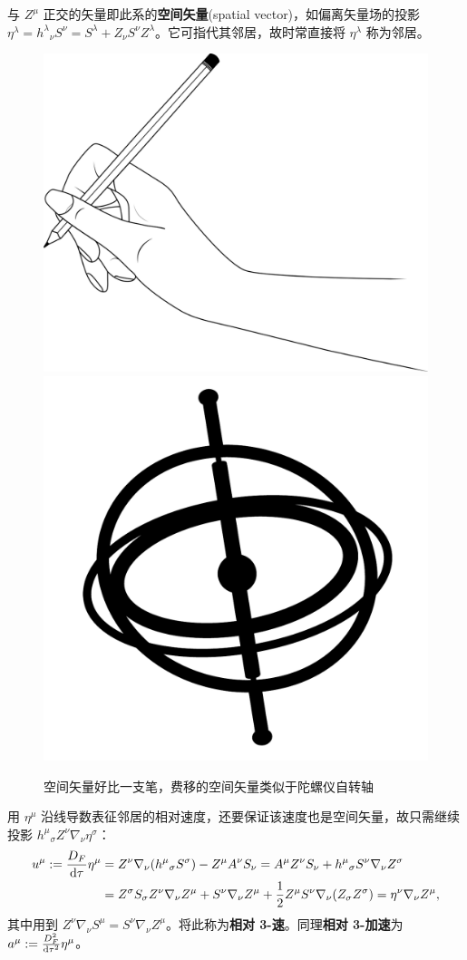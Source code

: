 与 $Z^\mu$ 正交的矢量即此系的\textbf{空间矢量}(spatial vector)，如偏离矢量场的投影 $\eta^\lambda=h^\lambda{}_\nu S^\nu=S^\lambda+ Z_\nu S^\nu Z^\lambda$。它可指代其邻居，故时常直接将 $\eta^\lambda$ 称为邻居。
\begin{figure}[h!]
    \centering
    \includegraphics[height=0.3\textwidth]{fig/chpt01/hand.png}\quad
    \includegraphics[height=0.3\textwidth]{fig/chpt01/gyroscope.pdf}
    \caption{空间矢量好比一支笔，费移的空间矢量类似于陀螺仪自转轴}
\end{figure}
用 $\eta^\mu$ 沿线导数表征邻居的相对速度，还要保证该速度也是空间矢量，故只需继续投影 $h^\mu{}_\sigma Z^\nu\nabla_\nu\eta^\sigma$：
\begin{align}
    u^\mu:=\frac{D_F}{\dd\tau}\eta^\mu &= Z^\nu\nabla_\nu(h^\mu{}_\sigma S^\sigma) - Z^\mu  A^\nu S_\nu = A^\mu Z^\nu S_\nu + h^\mu {}_\sigma S^\nu\nabla_\nu Z^\sigma \nonumber \\
    &= Z^\sigma S_\sigma Z^\nu \nabla_\nu Z^\mu + S^\nu\nabla_\nu Z^\mu + \frac 12 Z^\mu S^\nu\nabla_\nu(Z_\sigma Z^\sigma) = \eta^\nu\nabla_\nu Z^\mu,
\end{align}
其中用到 $Z^\nu\nabla_\nu S^\mu=S^\nu\nabla_\nu Z^\mu$。将此称为\textbf{相对 3-速}。同理\textbf{相对 3-加速}为 $a^\mu:=\frac{D_F^2}{\dd\tau^2}\eta^\mu$。


